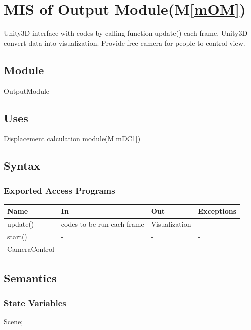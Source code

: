 \documentclass[12pt, titlepage]{article}
\newcommand{\mref}[1]{M\ref{#1}}
\begin{document}
\section{MIS of Output Module(\mref{mOM})}

Unity3D interface with codes by calling function update() each frame. Unity3D convert data into visualization. Provide free camera for people to control view.

\subsection{Module}

OutputModule

\subsection{Uses}

Displacement calculation module(\mref{mDC1})

\subsection{Syntax}

\subsubsection{Exported Access Programs}

\begin{center}
	\begin{tabular}{p{3cm} p{4cm} p{4cm} p{2cm}}
		\hline
		\textbf{Name} & \textbf{In} & \textbf{Out} & \textbf{Exceptions} \\
		\hline
		update() & codes to be run each frame & Visualization & - \\
		start() & - & - & - \\
		CameraControl & - & - & - \\
		\hline
	\end{tabular}
\end{center}

\subsection{Semantics}

\subsubsection{State Variables}
Scene;\\
\end{document}
